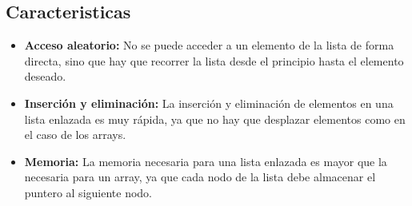 \documentclass[../main.tex]{subfiles}
\begin{document}
    \subsection{Caracteristicas}
        \begin{itemize}
            \item \textbf{Acceso aleatorio:} No se puede acceder a un elemento de la lista de forma directa, sino que hay que recorrer la lista desde el principio hasta el elemento deseado.
            \item \textbf{Inserción y eliminación:} La inserción y eliminación de elementos en una lista enlazada es muy rápida, ya que no hay que desplazar elementos como en el caso de los arrays.
            \item \textbf{Memoria:} La memoria necesaria para una lista enlazada es mayor que la necesaria para un array, ya que cada nodo de la lista debe almacenar el puntero al siguiente nodo.
        \end{itemize}
        
\end{document}
